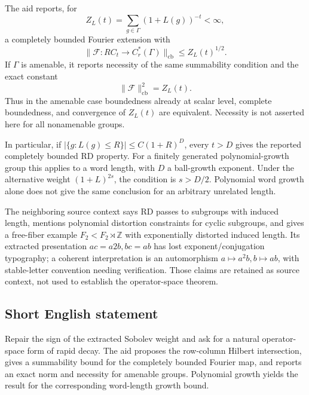 \documentclass[11pt]{article}
\newcommand{\Z}{\mathbb{Z}}
\begin{document}
The aid reports, for
\[
 Z_L(t)=\sum_{g\in\Gamma}(1+L(g))^{-t}<\infty,
\]
a completely bounded Fourier extension with
\[
 \|\mathcal F:RC_t\to C_r^*(\Gamma)\|_{\mathrm{cb}}
 \leq Z_L(t)^{1/2}.
\]
If \(\Gamma\) is amenable, it reports necessity of the same summability condition and the exact constant
\[
 \|\mathcal F\|_{\mathrm{cb}}^2=Z_L(t).
\]
Thus in the amenable case boundedness already at scalar level, complete boundedness, and convergence of \(Z_L(t)\) are equivalent. Necessity is not asserted here for all nonamenable groups.

In particular, if \(|\{g:L(g)\leq R\}|\leq C(1+R)^D\), every \(t>D\) gives the reported completely bounded RD property. For a finitely generated polynomial-growth group this applies to a word length, with \(D\) a ball-growth exponent. Under the alternative weight \((1+L)^{2s}\), the condition is \(s>D/2\). Polynomial word growth alone does not give the same conclusion for an arbitrary unrelated length.

The neighboring source context says RD passes to subgroups with induced length, mentions polynomial distortion constraints for cyclic subgroups, and gives a free-fiber example \(F_2< F_2\rtimes\Z\) with exponentially distorted induced length. Its extracted presentation \(ac=a2b,bc=ab\) has lost exponent/conjugation typography; a coherent interpretation is an automorphism \(a\mapsto a^2b,b\mapsto ab\), with stable-letter convention needing verification. Those claims are retained as source context, not used to establish the operator-space theorem.
\subsection{Short English statement}
Repair the sign of the extracted Sobolev weight and ask for a natural operator-space form of rapid decay. The aid proposes the row-column Hilbert intersection, gives a summability bound for the completely bounded Fourier map, and reports an exact norm and necessity for amenable groups. Polynomial growth yields the result for the corresponding word-length growth bound.
\end{document}
